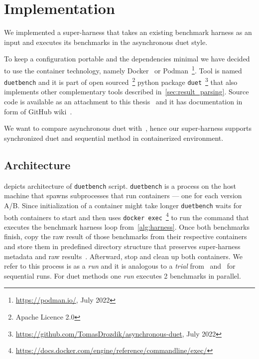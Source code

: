 \chapter{Implementation}

We implemented a super-harness that takes an existing benchmark harness as an input and executes its benchmarks in the asynchronous duet style.

To keep a configuration portable and the dependencies minimal we have decided to use the container technology, namely Docker~\cite{merkel2014docker} or Podman~\footnote{\url{https://podman.io/}, July 2022}.
Tool is named \lstinline{duetbench} and it is part of open sourced~\footnote{Apache Licence 2.0} python package \lstinline{duet}~\footnote{\url{https://github.com/TomasDrozdik/asynchronous-duet}, July 2022} that also implements other complementary tools described in~\cref{sec:result_parsing}.
Source code is available as an attachment to this thesis~ and it has documentation in form of GitHub wiki~\cite{wiki}.

We want to compare asynchronous duet with~\citet{bulej2020duet}, hence our super-harness supports synchronized duet and sequential method in containerized environment.

\section{Architecture}

 depicts architecture of \lstinline{duetbench} script.
\lstinline{duetbench} is a process on the host machine that spawns subprocesses that run containers --- one for each version A/B.
Since initialization of a container might take longer \lstinline{duetbench} waits for both containers to start and then uses \lstinline{docker exec}~\footnote{\url{https://docs.docker.com/engine/reference/commandline/exec/}} to run the command that executes the benchmark harness loop from~\cref{alg:harness}.
Once both benchmarks finish, copy the raw result of those benchmarks from their respective containers and store them in predefined directory structure that preserves super-harness metadata and raw results~\cite{wiki}.
Afterward, stop and clean up both containers.
We refer to this process is as a \emph{run} and it is analogous to a \emph{trial} from~\citet{laaber2019software} and~\citet{abedi2017conducting} for sequential runs.
For duet methods one \emph{run} executes 2 benchmarks in parallel.

